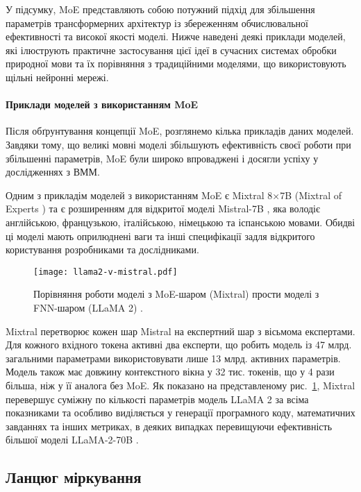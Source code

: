 У підсумку, MoE представляють собою потужний підхід для збільшення параметрів трансформерних архітектур із збереженням обчислювальної ефективності та високої якості моделі. Нижче наведені деякі приклади моделей, які ілюструють практичне застосування цієї ідеї в сучасних системах обробки природної мови та їх порівняння з традиційними моделями, що використовують щільні нейронні мережі.

\paragraph{Приклади моделей з використанням MoE}
Після обґрунтування концепції MoE, розглянемо кілька прикладів даних моделей. Завдяки тому, що великі мовні моделі збільшують ефективність своєї роботи при збільшенні параметрів, MoE були широко впроваджені і досягли успіху у дослідженнях з ВММ.

Одним з прикладім моделей з використанням MoE є Mixtral 8×7B (Mixtral of Experts \cite{jiang2024mixtralexperts}) та є розширенням для відкритої моделі Mistral-7B \cite{jiang2023mistral7b}, яка володіє англійською, французькою, італійською, німецькою та іспанською мовами. Обидві ці моделі мають оприлюднені ваги та інші специфікації задля відкритого користування розробниками та дослідниками.

\begin{figure}[h]
    \centering
    \texttt{[image: llama2-v-mistral.pdf]}
    \caption{Порівняння роботи моделі з MoE-шаром (Mixtral) прости моделі з FNN-шаром (LLaMA 2) \cite{jiang2024mixtralexperts}.}
    \label{fig:llama2-v-mistral}
\end{figure}

Mixtral перетворює кожен шар Mistral на експертний шар з вісьмома експертами. Для кожного вхідного токена активні два експерти, що робить модель із 47 млрд. загальними параметрами використовувати лише 13 млрд. активних параметрів. Модель також має довжину контекстного вікна у 32 тис. токенів, що у 4 рази більша, ніж у її аналога без MoE. Як показано на представленому рис.~\ref{fig:llama2-v-mistral}, Mixtral перевершує суміжну по кількості параметрів модель LLaMA 2 за всіма показниками та особливо виділяється у генерації програмного коду, математичних завданнях та інших метриках, в деяких випадках перевищуючи ефективність більшої моделі LLaMA-2-70B \cite{touvron2023llama2openfoundation}.

\subsection{Ланцюг міркування}

